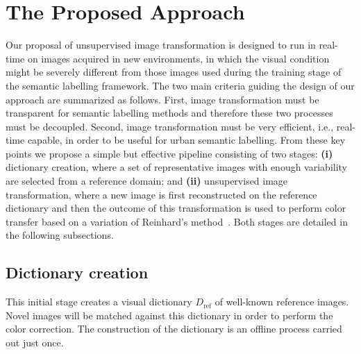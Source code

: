\section{The Proposed Approach}

Our proposal of unsupervised image transformation is designed to run in real-time
on images acquired in new environments, in which the visual
condition might be severely different from those images used
during the training stage of the semantic labelling framework. The
two main criteria guiding the design of our approach are
summarized as follows. First, image transformation must be
transparent for semantic labelling methods and therefore these two
processes must be decoupled. Second, image transformation must be
very efficient, i.e., real-time capable, in order to be useful for
urban semantic labelling. From these key points we propose a
simple but effective pipeline consisting of two stages:
\textbf{(i)} dictionary creation, where a set of representative
images with enough variability are selected from a reference
domain; and \textbf{(ii)} unsupervised image transformation, where a new
image is first reconstructed on the reference dictionary and then the
outcome of this transformation is used to perform color transfer
based on a variation of Reinhard's method~\cite{Reinhard:2001}.
Both stages are detailed in the following subsections.


\subsection{Dictionary creation}
\label{subsect:basisSelection}



This initial stage creates a visual dictionary $D_\text{ref}$ of
well-known reference images. Novel images will be matched against
this dictionary in order to perform the color correction. The
construction of the dictionary is an offline process carried out
just once.



